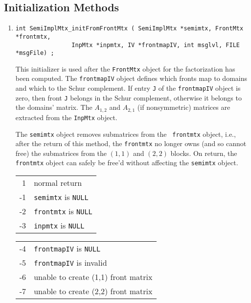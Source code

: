 \subsection{Initialization Methods}
\label{subsection:SemiImplMtx:proto:initializers}
\par
\begin{enumerate}
\item
\begin{verbatim}
int SemiImplMtx_initFromFrontMtx ( SemiImplMtx *semimtx, FrontMtx *frontmtx, 
                InpMtx *inpmtx, IV *frontmapIV, int msglvl, FILE *msgFile) ;
\end{verbatim}
This initializer is used after the {\tt FrontMtx} object for the
factorization has been computed.
The {\tt frontmapIV} object defines which fronts map to domains
and which to the Schur complement.
If entry {\tt J} of the {\tt frontmapIV} object is zero, then front
{\tt J} belongs in the Schur complement, otherwise it belongs to
the domains' matrix.
The $A_{1,2}$ and $A_{2,1}$ (if nonsymmetric) matrices are
extracted from the {\tt InpMtx} object.
\par
The {\tt semimtx} object removes submatrices from the {\tt
frontmtx} object, i.e., after the return of this method,
the {\tt frontmtx} no longer owns (and so cannot free) the
submatrices from the $(1,1)$ and $(2,2)$ blocks.
On return, the {\tt frontmtx} object can safely be free'd
without affecting the {\tt semimtx} object.
\par {}
\begin{center}
\begin{tabular}{rl}
 1 & normal return \\
-1 & {\tt semimtx} is {\tt NULL} \\
-2 & {\tt frontmtx} is {\tt NULL} \\
-3 & {\tt inpmtx} is {\tt NULL} \\
\end{tabular}
\quad
\begin{tabular}{rl}
-4 & {\tt frontmapIV} is {\tt NULL} \\
-5 & {\tt frontmapIV} is invalid \\
-6 & unable to create (1,1) front matrix \\
-7 & unable to create (2,2) front matrix \\

\end{tabular}
\end{center}
\end{enumerate}
